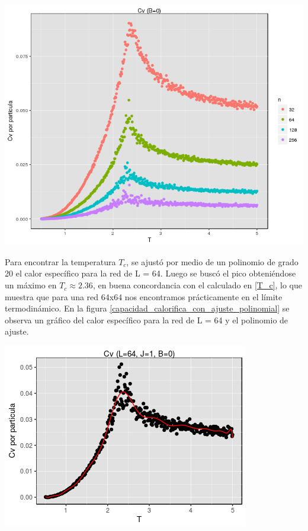 \documentclass[%
 reprint,
 amsmath,amssymb,
 aps,
spanish]{revtex4-1}
\begin{document}
\begin{minipage}{0.45\textwidth}									
\centering
\includegraphics[totalheight=0.25\textheight]{imagenes/con_corona/cv.png}
\label{grafico_capacidad_calorifica}
\end{minipage}

Para encontrar la temperatura $T_c$, se ajustó por medio de un polinomio de grado 20 el calor específico para la red de L = 64. Luego se buscó el pico obteniéndose un máximo en $T_c\approx2.36$, en buena concordancia con el calculado en \ref{T_c}, lo que muestra que para una red 64x64 nos encontramos prácticamente en el límite termodinámico. 
En la figura \ref{capacidad_calorifica_con_ajuste_polinomial} se observa un gráfico del calor específico para la red de L = 64 y el polinomio de ajuste.

\begin{minipage}{0.45\textwidth}									
\centering
\includegraphics[totalheight=0.25\textheight]{imagenes/con_corona/ajuste_cv.png}
\label{capacidad_calorifica_con_ajuste_polinomial}
\end{minipage}
\end{document}

